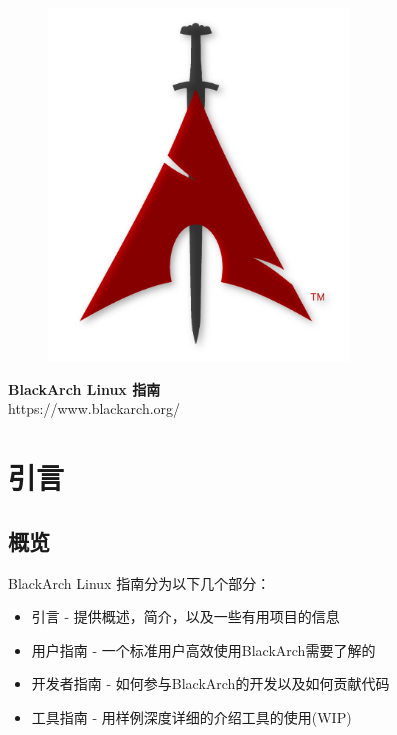 \documentclass[a4paper, oneside, 11pt]{book}
\begin{document}
\pagestyle{empty}
\begin{center}
\begin{figure}[htbp]
\centering
\vspace{0.5cm}
\includegraphics[width=8cm]{images/logo.png}
\label{fig:logo}
\end{figure}
\vspace{0.5cm}
\Huge{\textbf{BlackArch Linux 指南}}\\
\vspace{1cm}
\Large{\color{red}https://www.blackarch.org/}\\
\vspace{0.5cm}
\end{center}
\newpage
\tableofcontents
\newpage
\pagestyle{fancy}


\chapter{引言}

\section{概览}
BlackArch Linux 指南分为以下几个部分：
\begin{itemize}
\item 引言 - 提供概述，简介，以及一些有用项目的信息
\item 用户指南 - 一个标准用户高效使用BlackArch需要了解的
\item 开发者指南 - 如何参与BlackArch的开发以及如何贡献代码
\item 工具指南 - 用样例深度详细的介绍工具的使用(WIP)
\end{itemize}
\end{document}
